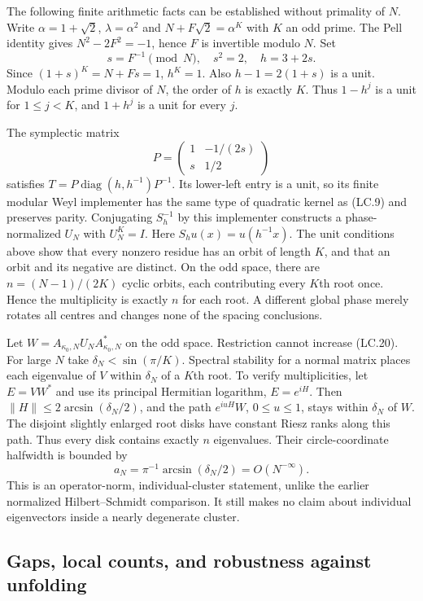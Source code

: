 The following finite arithmetic facts can be established without primality of \(N\). Write \(\alpha=1+\sqrt2\), \(\lambda=\alpha^2\) and \(N+F\sqrt2=\alpha^K\) with \(K\) an odd prime. The Pell identity gives \(N^2-2F^2=-1\), hence \(F\) is invertible modulo \(N\). Set \[
 s=F^{-1}\pmod N,\quad s^2=2,\quad h=3+2s.
\] Since \((1+s)^K=N+Fs=1\), \(h^K=1\). Also \(h-1=2(1+s)\) is a unit. Modulo each prime divisor of \(N\), the order of \(h\) is exactly \(K\). Thus \(1-h^j\) is a unit for \(1\leq j<K\), and \(1+h^j\) is a unit for every \(j\).

The symplectic matrix \[
 P=\begin{pmatrix}1&-1/(2s)\\s&1/2\end{pmatrix}
\] satisfies \(T=P\operatorname{diag}(h,h^{-1})P^{-1}\). Its lower-left entry is a unit, so its finite modular Weyl implementer has the same type of quadratic kernel as (LC.9) and preserves parity. Conjugating \(S_h^{-1}\) by this implementer constructs a phase-normalized \(U_N\) with \(U_N^K=I\). Here \(S_hu(x)=u(h^{-1}x)\). The unit conditions above show that every nonzero residue has an orbit of length \(K\), and that an orbit and its negative are distinct. On the odd space, there are \(n=(N-1)/(2K)\) cyclic orbits, each contributing every \(K\)th root once. Hence the multiplicity is exactly \(n\) for each root. A different global phase merely rotates all centres and changes none of the spacing conclusions.

Let \(W=A_{{\kappa_0},N}U_NA_{{\kappa_0},N}^*\) on the odd space. Restriction cannot increase (LC.20). For large \(N\) take \(\delta_N<\sin(\pi/K)\). Spectral stability for a normal matrix places each eigenvalue of \(V\) within \(\delta_N\) of a \(K\)th root. To verify multiplicities, let \(E=VW^*\) and use its principal Hermitian logarithm, \(E=e^{iH}\). Then \(\|H\|\leq2\arcsin(\delta_N/2)\), and the path \(e^{iuH}W\), \(0\leq u\leq1\), stays within \(\delta_N\) of \(W\). The disjoint slightly enlarged root disks have constant Riesz ranks along this path. Thus every disk contains exactly \(n\) eigenvalues. Their circle-coordinate halfwidth is bounded by \[
 a_N=\pi^{-1}\arcsin(\delta_N/2)=O(N^{-\infty}).              \tag{LC.22}
\] This is an operator-norm, individual-cluster statement, unlike the earlier normalized Hilbert--Schmidt comparison. It still makes no claim about individual eigenvectors inside a nearly degenerate cluster.

\subsection{Gaps, local counts, and robustness against unfolding}\label{locality:gaps-local-counts-and-robustness-against-unfolding}

